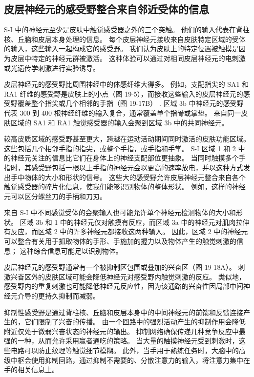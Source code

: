 \subsection{皮层神经元的感受野整合来自邻近受体的信息}
S-I 中的神经元至少是皮肤中触觉感受器之外的三个突触。 他们的输入代表在背柱核、丘脑和皮层本身处理的信息。 每个皮层神经元接收来自皮肤特定区域的受体的输入，这些输入一起构成它的感受野。 我们认为皮肤上的特定位置被触摸是因为皮层中特定的神经元群被激活。 这种体验可以通过对相同皮层神经元的电刺激或光遗传学刺激进行实验诱导。

皮层神经元的感受野比周围神经中的体感纤维大得多。 例如，支配指尖的 SA1 和 RA1 纤维的感受野是皮肤上的小点（图 19-5），而接收这些输入的皮层神经元的感受野覆盖整个指尖或几个相邻的手指（图 19-17B） . 区域 3b 中神经元的感受野代表 300 到 400 根神经纤维的输入复合，通常覆盖单个指骨或掌垫。 来自同一皮肤区域的 SA1 和 RA1 触觉感受器的输入会聚到区域 3b 中的共同神经元。

较高皮质区域的感受野甚至更大，跨越在运动活动期间同时激活的皮肤功能区域。 这些包括几个相邻手指的指尖，或整个手指，或手指和手掌。 S-I 区域 1 和 2 中的神经元关注的信息比它们在身体上的神经支配部位更抽象。 当同时触摸多个手指时，其感受野包括一根以上手指的神经元会以更高的速率放电，并以这种方式发出手中物体的大小和形状的信号。 这些大的感受野允许皮层神经元整合来自各个触觉感受器的碎片化信息，使我们能够识别物体的整体形状。 例如，这样的神经元可以区分螺丝刀的手柄和刀刃。

来自 S-I 中不同感觉受体的会聚输入也可能允许单个神经元检测物体的大小和形状。 区域 3b 和 1 中的神经元仅对触摸有反应，而区域 3a 中的神经元对肌肉拉伸有反应，而区域 2 中的许多神经元都接收这两种输入。 因此，区域 2 中的神经元可以整合有关用于抓取物体的手形、手施加的握力以及物体产生的触觉刺激的信息； 这种综合信息可能足以识别物体。

皮层神经元的感受野通常有一个被抑制区包围或叠加的兴奋区（图 19-18A）。 刺激兴奋区外的皮肤区域可能会降低神经元对感受野内触觉刺激的反应。 类似地，感受野内的重复刺激也可能降低神经元反应性，因为该通路的兴奋性因局部中间神经元介导的更持久抑制而减弱。

抑制性感受野是通过背柱核、丘脑和皮层本身中的中间神经元的前馈和反馈连接产生的，它们限制了兴奋的传播。 由一个回路中的强烈活动产生的抑制作用会降低附近仅处于微弱兴奋状态的神经元的输出。 抑制网络确保传递几种竞争反应中最强的一种，从而允许采用赢者通吃的策略。 当大量的触摸神经元受到刺激时，这些电路可以防止纹理等触觉细节模糊。 此外，当手用于熟练任务时，大脑中的高级中枢会使用抑制回路，通过抑制不需要的、分散注意力的输入，将注意力集中在手的相关信息上。

